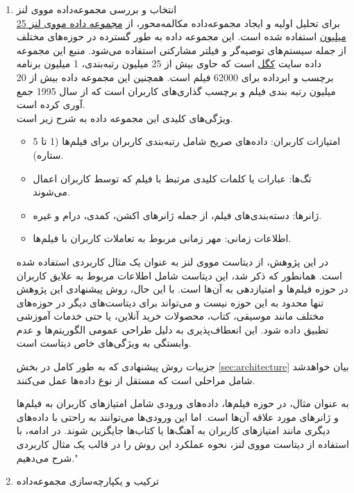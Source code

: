 \begin{enumerate}
\item
انتخاب و بررسی مجموعه‌داده مووی لنز\\
برای تحلیل اولیه و ایجاد مجموعه‌داده مکالمه‌محور، از 
\href{https://www.kaggle.com/datasets/garymk/movielens-25m-dataset}{مجموعه داده مووی لنز 25 میلیون}
 استفاده شده است. این مجموعه داده به طور گسترده در حوزه‌های مختلف از جمله سیستم‌های توصیه‌گر و فیلتر مشارکتی استفاده می‌شود. منبع این مجموعه داده سایت 
\href{https://www.kaggle.com}{کگل}
 است که حاوی بیش از 25 میلیون رتبه‌بندی، 1 میلیون برنامه برچسب و ابرداده برای 62000 فیلم است. همچنین این مجموعه داده بیش از 20 میلیون رتبه بندی فیلم و برچسب گذاری‌های کاربران است که از سال 1995 جمع آوری کرده است. \\


ویژگی‌های کلیدی این مجموعه داده به شرح زیر است.
\begin{itemize}
\item
امتیازات کاربران: داده‌های صریح شامل رتبه‌بندی کاربران برای فیلم‌ها (1 تا 5 ستاره).
\item
تگ‌ها: عبارات یا کلمات کلیدی مرتبط با فیلم که توسط کاربران اعمال می‌شوند.
\item
ژانرها: دسته‌بندی‌های فیلم، از جمله ژانرهای اکشن، کمدی، درام و غیره.
\item
اطلاعات زمانی: مهر زمانی مربوط به تعاملات کاربران با فیلم‌ها.
\end{itemize}

در این پژوهش، از دیتاست مووی لنز به عنوان یک مثال کاربردی استفاده شده است. همانطور که ذکر شد، این دیتاست شامل اطلاعات مربوط به علایق کاربران در حوزه فیلم‌ها و امتیازدهی به آن‌ها است. با این حال، روش پیشنهادی این پژوهش تنها محدود به این حوزه نیست و می‌تواند برای دیتاست‌های دیگر در حوزه‌های مختلف مانند موسیقی، کتاب، محصولات خرید آنلاین، یا حتی خدمات آموزشی تطبیق داده شود. این انعطاف‌پذیری به دلیل طراحی عمومی الگوریتم‌ها و عدم وابستگی به ویژگی‌های خاص دیتاست است.
 
جزییات روش پیشنهادی که به طور کامل در بخش%
\ref{sec:architecture}
 بیان خواهدشد شامل مراحلی است که مستقل از نوع داده‌ها عمل می‌کنند.

به عنوان مثال، در حوزه فیلم‌ها، داده‌های ورودی شامل امتیازهای کاربران به فیلم‌ها و ژانرهای مورد علاقه آن‌ها است. اما این ورودی‌ها می‌توانند به راحتی با داده‌های دیگری مانند امتیازهای کاربران به آهنگ‌ها یا کتاب‌ها جایگزین شوند. در ادامه، با استفاده از دیتاست مووی لنز، نحوه عملکرد این روش را در قالب یک مثال کاربردی شرح می‌دهیم." 

\item
ترکیب و یکپارچه‌سازی مجموعه‌داده
 

\end{enumerate}
